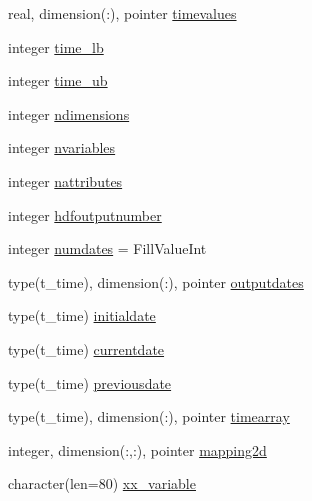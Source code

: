 \begin{DoxyCompactItemize}
\item 
real, dimension(\+:), pointer \mbox{\hyperlink{structmodulewoaformat_1_1t__woaformat_a895114dc6730bd842e108186b876f602}{timevalues}}
\item 
integer \mbox{\hyperlink{structmodulewoaformat_1_1t__woaformat_aa697b8e28926135138a94f0ecc2f71ef}{time\+\_\+lb}}
\item 
integer \mbox{\hyperlink{structmodulewoaformat_1_1t__woaformat_ad6f8a5324b2116491ef6ec4af0c44969}{time\+\_\+ub}}
\item 
integer \mbox{\hyperlink{structmodulewoaformat_1_1t__woaformat_a233fe58fa1558271480959f10faf7777}{ndimensions}}
\item 
integer \mbox{\hyperlink{structmodulewoaformat_1_1t__woaformat_a322953381b0fc6ef90ee94eaa79522b1}{nvariables}}
\item 
integer \mbox{\hyperlink{structmodulewoaformat_1_1t__woaformat_add7a8d09130d4d93ab3323d0e5130d01}{nattributes}}
\item 
integer \mbox{\hyperlink{structmodulewoaformat_1_1t__woaformat_a1fd9f745b38047b2b36306d4983e1771}{hdfoutputnumber}}
\item 
integer \mbox{\hyperlink{structmodulewoaformat_1_1t__woaformat_abb84780fe70a90c7da3b2e3a9f9ee46d}{numdates}} = Fill\+Value\+Int
\item 
type(t\+\_\+time), dimension(\+:), pointer \mbox{\hyperlink{structmodulewoaformat_1_1t__woaformat_ae3cb91108d9ff67668d2b6a061229f57}{outputdates}}
\item 
type(t\+\_\+time) \mbox{\hyperlink{structmodulewoaformat_1_1t__woaformat_abb02a634853c86e9873e9c5b3fc94044}{initialdate}}
\item 
type(t\+\_\+time) \mbox{\hyperlink{structmodulewoaformat_1_1t__woaformat_a332b8df70864698db9e6e6316cf869b4}{currentdate}}
\item 
type(t\+\_\+time) \mbox{\hyperlink{structmodulewoaformat_1_1t__woaformat_ac39a6e8ff1423d2f780916ef56e4b470}{previousdate}}
\item 
type(t\+\_\+time), dimension(\+:), pointer \mbox{\hyperlink{structmodulewoaformat_1_1t__woaformat_a196f1d2e82ac733de0d07033d3b54854}{timearray}}
\item 
integer, dimension(\+:,\+:), pointer \mbox{\hyperlink{structmodulewoaformat_1_1t__woaformat_a51cf60e1a444ea69bed7496e912d5c0e}{mapping2d}}
\item 
character(len=80) \mbox{\hyperlink{structmodulewoaformat_1_1t__woaformat_a8fa9732b2d3ef148a23c9363904e403d}{xx\+\_\+variable}}
\item 

\end{DoxyCompactItemize}
